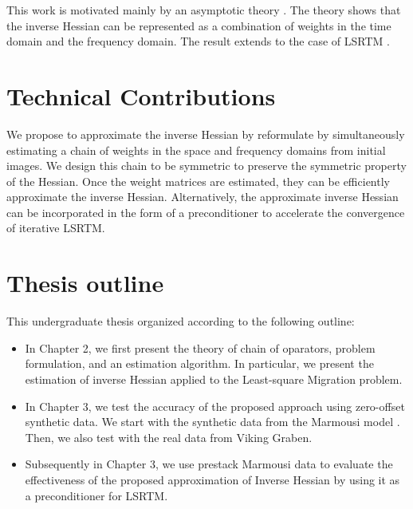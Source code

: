 This work is motivated mainly by an asymptotic theory \cite[]{miller1987,bleistein1987}. The theory shows that the inverse Hessian can be represented as a combination of weights in the time domain and the frequency domain. The result extends to the case of LSRTM \cite[]{hou15,hou16}. 

\section{Technical Contributions}

We propose to approximate the inverse Hessian by reformulate by simultaneously estimating a chain of weights in the space and frequency domains from initial images. We design this chain to be symmetric to preserve the symmetric property of the Hessian.
Once the weight matrices are estimated, they can be efficiently approximate the inverse Hessian. Alternatively, the approximate inverse Hessian can be incorporated in the form of a preconditioner to accelerate the convergence of iterative LSRTM.


\section{Thesis outline}

This undergraduate thesis organized according to the following outline:

 
\begin{itemize}

\item In Chapter 2, we first present the theory of chain of oparators, problem formulation, and an estimation algorithm. In particular, we present the estimation of inverse Hessian applied to the Least-square Migration problem. 

\item In Chapter 3, we test the accuracy of the proposed approach using zero-offset synthetic data. We start with the synthetic data from the Marmousi model \cite[]{versteeg1994}. Then, we also test with the real data from Viking Graben. 

\item Subsequently in Chapter 3, we use prestack Marmousi data  to evaluate the effectiveness of the proposed approximation of Inverse Hessian  by using it as a preconditioner for LSRTM.
\end{itemize}
